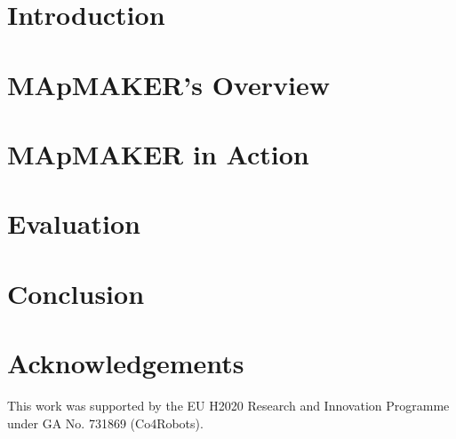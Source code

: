 \documentclass[10pt,conference]{IEEEtran}
\begin{document}
	\section{Introduction}
	
	
	\section{MApMAKER's Overview}
	\label{sec:approach}
	
	
	\section{MApMAKER in Action}
	\label{sec:tool}
	
	
	
	\section{Evaluation}
	\label{sec:evaluation}
	
	
	
	\section{Conclusion}
	\label{sec:conclusion}
	

\section*{Acknowledgements}
This work was supported by the EU H2020 Research and Innovation Programme under GA No. 731869 (Co4Robots).

	\balance
	
	
	
\end{document}
